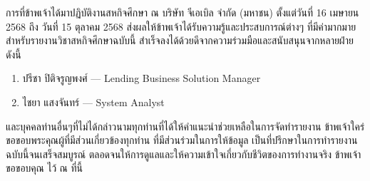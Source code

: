 \iffalse
\begin{dedication}
This document is dedicated to all Chiang Mai University students.

Dedication page is optional.
\end{dedication}
\fi %

\begin{acknowledgments}
    การที่ข้าพเจ้าได้มาปฏิบัติงานสหกิจศึกษา ณ บริษัท จีเอเบิล จำกัด (มหาชน)  ตั้งแต่วันที่ 16 เมษายน 2568  ถึง วันที่  15 ตุลาคม 2568  ส่งผลให้ข้าพเจ้าได้รับความรู้และประสบการณ์ต่างๆ ที่มีค่ามากมาย สำหรับรายงานวิชาสหกิจศึกษาฉบับนี้  สำเร็จลงได้ด้วยดีจากความร่วมมือและสนับสนุนจากหลายฝ่าย  ดังนี้
    \begin{enumerate}
        \item ปรีชา ปิติจรูญพงศ์ — Lending Business Solution Manager
        \item ไชยา แสงจันทร์ — System Analyst
    \end{enumerate}
    และบุคคลท่านอื่นๆที่ไม่ได้กล่าวนามทุกท่านที่ได้ให้คำแนะนำช่วยเหลือในการจัดทำรายงาน
	ข้าพเจ้าใคร่ขอขอบพระคุณผู้ที่มีส่วนเกี่ยวข้องทุกท่าน ที่มีส่วนร่วมในการให้ข้อมูล เป็นที่ปรึกษาในการทำรายงานฉบับนี้จนเสร็จสมบูรณ์ ตลอดจนให้การดูแลและให้ความเข้าใจเกี่ยวกับชีวิตของการทำงานจริง ข้าพเจ้าขอขอบคุณ ไว้ ณ ที่นี้
\end{acknowledgments}%
\fi %

\contentspage

\ifproject
\figurelistpage

\tablelistpage
\fi %



